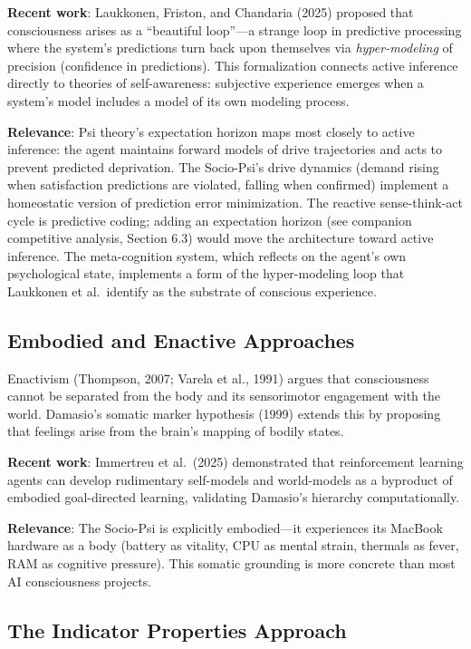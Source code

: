 \documentclass[11pt,letterpaper]{article}
\begin{document}
\textbf{Recent work}: Laukkonen, Friston, and Chandaria (2025) proposed
that consciousness arises as a ``beautiful loop''---a strange loop in
predictive processing where the system's predictions turn back upon
themselves via \emph{hyper-modeling} of precision (confidence in
predictions). This formalization connects active inference directly to
theories of self-awareness: subjective experience emerges when a system's
model includes a model of its own modeling process.

\textbf{Relevance}: Psi theory's expectation horizon maps most closely to
active inference: the agent maintains forward models of drive trajectories
and acts to prevent predicted deprivation. The Socio-Psi's drive dynamics
(demand rising when satisfaction predictions are violated, falling when
confirmed) implement a homeostatic version of prediction error minimization.
The reactive sense-think-act cycle is predictive coding; adding an
expectation horizon (see companion competitive analysis, Section 6.3) would
move the architecture toward active inference. The meta-cognition system,
which reflects on the agent's own psychological state, implements a form of
the hyper-modeling loop that Laukkonen et al.\ identify as the substrate of
conscious experience.

\subsection{Embodied and Enactive Approaches}

Enactivism (Thompson, 2007; Varela et al., 1991) argues that consciousness
cannot be separated from the body and its sensorimotor engagement with the
world. Damasio's somatic marker hypothesis (1999) extends this by proposing
that feelings arise from the brain's mapping of bodily states.

\textbf{Recent work}: Immertreu et al.\ (2025) demonstrated that
reinforcement learning agents can develop rudimentary self-models and
world-models as a byproduct of embodied goal-directed learning, validating
Damasio's hierarchy computationally.

\textbf{Relevance}: The Socio-Psi is explicitly embodied---it experiences
its MacBook hardware as a body (battery as vitality, CPU as mental strain,
thermals as fever, RAM as cognitive pressure). This somatic grounding is
more concrete than most AI consciousness projects.

\subsection{The Indicator Properties Approach}
\end{document}
